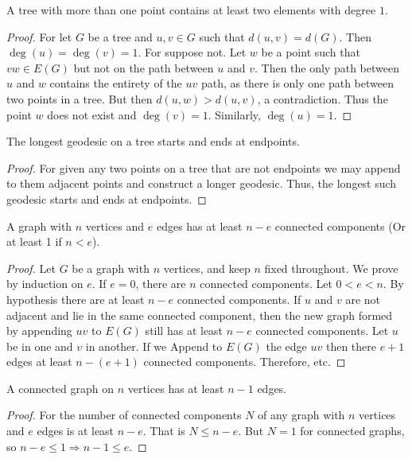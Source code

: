         \begin{corollary}
        A tree with more than one point contains at least two elements with degree $1$.
        \end{corollary}
        \begin{proof}
        For let $G$ be a tree and $u,v\in G$ such that $d(u,v) = d(G)$. Then $\deg(u) = \deg(v) = 1$. For suppose not. Let $w$ be a point such that $vw\in E(G)$ but not on the path between $u$ and $v$. Then the only path between $u$ and $w$ contains the entirety of the $uv$ path, as there is only one path between two points in a tree. But then $d(u,w)>d(u,v)$, a contradiction. Thus the point $w$ does not exist and $\deg(v)=1$. Similarly, $\deg(u)=1$.
        \end{proof}
        \begin{corollary}
        The longest geodesic on a tree starts and ends at endpoints.
        \end{corollary}
        \begin{proof}
        For given any two points on a tree that are not endpoints we may append to them adjacent points and construct a longer geodesic. Thus, the longest such geodesic starts and ends at endpoints.
        \end{proof}
        \begin{lemma}
        A graph with $n$ vertices and $e$ edges has at least $n-e$ connected components (Or at least 1 if $n<e$).
        \end{lemma}
        \begin{proof}
        Let $G$ be a graph with $n$ vertices, and keep $n$ fixed throughout. We prove by induction on $e$. If $e=0$, there are $n$ connected components. Let $0<e < n$. By hypothesis there are at least $n-e$ connected components. If $u$ and $v$ are not adjacent and lie in the same connected component, then the new graph formed by appending $uv$ to $E(G)$ still has at least $n-e$ connected components. Let $u$ be in one and $v$ in another. If we Append to $E(G)$ the edge $uv$ then there $e+1$ edges at least $n-(e+1)$ connected components. Therefore, etc.
        \end{proof}
        \begin{corollary}
        A connected graph on $n$ vertices has at least $n-1$ edges.
        \end{corollary}
        \begin{proof}
        For the number of connected components $N$ of any graph with $n$ vertices and $e$ edges is at least $n-e$. That is $N\leq n-e$. But $N=1$ for connected graphs, so $n-e\leq 1 \Rightarrow n-1\leq e$.
        \end{proof}
